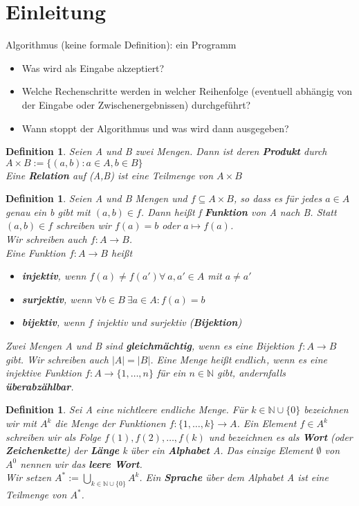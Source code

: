 \documentclass[12pt,a4paper]{article}
\theoremstyle{plain}
\newtheorem{Definition}[Theorem]{Definition}
\newcommand{\herv}[1]{{\emph{\textbf{#1}}}}
\numberwithin{equation}{section}
\begin{document}
\section{Einleitung}
Algorithmus (keine formale Definition): \glqq ein Programm \grqq \begin{itemize}
\item Was wird als Eingabe akzeptiert?
\item Welche Rechenschritte werden in welcher Reihenfolge (eventuell abhängig von der Eingabe oder Zwischenergebnissen) durchgeführt?
\item Wann stoppt der Algorithmus und was wird dann ausgegeben?
\end{itemize}
\begin{Definition}
Seien A und B zwei Mengen. Dann ist deren \herv{Produkt} durch \\
$A\times B := \{(a,b): a \in A, b\in B \}$ \\
Eine \herv{Relation} auf (A,B) ist eine Teilmenge von $A\times B $
\end{Definition}
\begin{Definition}
Seien A und B Mengen und $f\subseteq A\times B$, so dass es für jedes $a \in A$ genau ein b gibt mit $(a,b)\in f$. Dann heißt f \herv{Funktion} von A nach B. Statt $(a,b) \in f$ schreiben wir $f(a)=b$ oder $a \mapsto f(a)$. \\
Wir schreiben auch $f: A \rightarrow B$.\\
Eine Funktion $f: A\rightarrow B$ heißt 
\begin{itemize}
\item \herv{injektiv}, wenn $f(a)\neq f(a') \forall\ a,a'\in A$ mit $a\neq a'$
\item \herv{surjektiv}, wenn $\forall b\in B\  \exists a \in A: f(a)=b$
\item \herv{bijektiv}, wenn $f$ injektiv und surjektiv (\herv{Bijektion})
\end{itemize}
Zwei Mengen A und B sind \herv{gleichmächtig}, wenn es eine Bijektion $f: A\rightarrow B$ gibt. Wir schreiben auch $|A|=|B|$. Eine Menge heißt $endlich$, wenn es eine injektive Funktion $f:A \rightarrow \{1,\ldots,n\}$ für ein $n \in \mathbb{N}$ gibt, andernfalls \herv{überabzählbar}.
\end{Definition}
\begin{Definition}
Sei A eine nichtleere endliche Menge. Für $k\in \mathbb{N}\cup\{0\}$ bezeichnen wir mit $A^k$ die Menge der Funktionen $f:\{1,\ldots,k\}\rightarrow A$. Ein Element $f\in A^k$ schreiben wir als Folge $f(1),f(2),\ldots,f(k)$ und bezeichnen es als \herv{Wort} (oder \herv{Zeichenkette}) der \herv{Länge} k über ein \herv{Alphabet} A. Das einzige Element $\emptyset$ von $A^0$ nennen wir das \herv{leere Wort}. \\
Wir setzen $A^*:=\bigcup_{k\in \mathbb{N}\cup\{0\}} A^k$. Ein \herv{Sprache} über dem Alphabet A ist eine Teilmenge von $A^*$.
\end{Definition}
\end{document}
